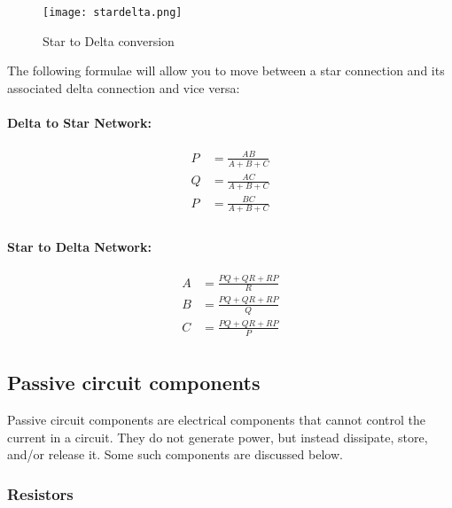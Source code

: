 \begin{figure}[!htb]
\centering
\texttt{[image: stardelta.png]}
\caption{Star to Delta conversion}
\label{fig:starToDelta}
\end{figure}

The following formulae will allow you to move between a star connection and its associated delta connection and vice versa:

\begin{minipage}{0.5\textwidth}
\centering
\paragraph*{Delta to Star Network:}
\begin{equation*}
\begin{aligned}
P &= \frac{A B}{A + B + C}\\
Q &= \frac{A C}{A + B + C}\\
P &= \frac{B C}{A + B + C}\\
\end{aligned}
\end{equation*}
\end{minipage}
\begin{minipage}{0.5\textwidth}
\centering
\paragraph*{Star to Delta Network:}
\begin{equation*}
\begin{aligned}
A &= \frac{P Q + Q R + R P}{R}\\
B &= \frac{P Q + Q R + R P}{Q}\\
C &= \frac{P Q + Q R + R P}{P}\\
\end{aligned}
\end{equation*}

\end{minipage}



\subsection*{Passive circuit components}

Passive circuit components are electrical components that cannot control the current in a circuit. They do not generate power, but instead dissipate, store, and/or release it. Some such components are discussed below.

\subsubsection*{Resistors}

